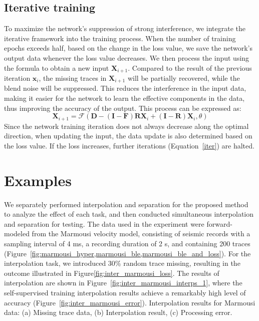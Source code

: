 \documentclass{segabs}
\begin{document}
\subsection{Iterative training}
To maximize the network's suppression of strong interference, we integrate the iterative framework into the training process. When the number of training epochs exceeds half, based on the change in the loss value, we save the network's output data whenever the loss value decreases. We then process the input using the formula to obtain a new input $\mathbf{X}_{i+1}$. Compared to the result of the previous iteration $\mathbf{x}_{i}$, the missing traces in $\mathbf{X}_{i+1}$ will be partially recovered, while the blend noise will be suppressed. This reduces the interference in the input data, making it easier for the network to learn the effective components in the data, thus improving the accuracy of the output. This process can be expressed as:
\begin{equation}\label{iter}
\mathbf{X}_{i+1} = \mathcal{F}(\mathbf{D}-(\mathbf{I}-\mathbf{F})\mathbf{R}\mathbf{X}_{i}+(\mathbf{I}-\mathbf{R})\mathbf{X}_{i},\theta)
\end{equation}
Since the network training iteration does not always decrease along the optimal direction, when updating the input, the data update is also determined based on the loss value. If the loss increases, further iterations (Equation~\ref{iter}) are halted.

\section{Examples}
We separately performed interpolation and separation for the proposed method to analyze the effect of each task, and then conducted simultaneous interpolation and separation for testing. The data used in the experiment were forward-modeled from the Marmousi velocity model, consisting of seismic records with a sampling interval of 4 ms, a recording duration of 2 s, and containing 200 traces (Figure~\ref{fig:marmousi_hyper,marmousi_ble,marmousi_ble_and_loss}). 
For the interpolation task, we introduced 30\% random trace missing, resulting in the outcome illustrated in Figure\ref{fig:inter_marmousi_loss}. The results of interpolation are shown in Figure~\ref{fig:inter_marmousi_interps_1}, where the self-supervised training interpolation results achieve a remarkably high level of accuracy (Figure~\ref{fig:inter_marmousi_error}).
{Interpolation results for Marmousi data:
(a) Missing trace data,
(b) Interpolation result,
(c) Processing error.}
\end{document}
